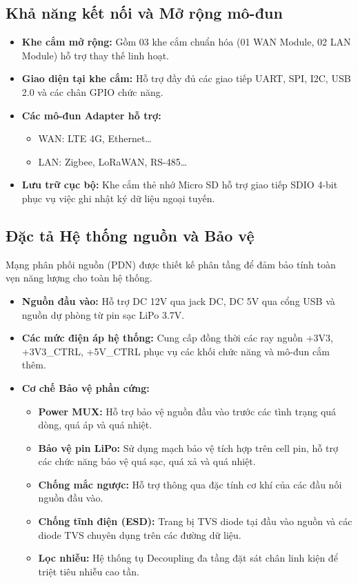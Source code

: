 \subsection{Khả năng kết nối và Mở rộng mô-đun}
\begin{itemize}
    \item \textbf{Khe cắm mở rộng:} Gồm 03 khe cắm chuẩn hóa (01 WAN Module, 02 LAN Module) hỗ trợ thay thế linh hoạt.
    \item \textbf{Giao diện tại khe cắm:} Hỗ trợ đầy đủ các giao tiếp UART, SPI, I2C, USB 2.0 và các chân GPIO chức năng.
    \item \textbf{Các mô-đun Adapter hỗ trợ:}
    \begin{itemize}
        \item WAN: LTE 4G, Ethernet\dots
        \item LAN: Zigbee, LoRaWAN, RS-485\dots
    \end{itemize}
    \item \textbf{Lưu trữ cục bộ:} Khe cắm thẻ nhớ Micro SD hỗ trợ giao tiếp SDIO 4-bit phục vụ việc ghi nhật ký dữ liệu ngoại tuyến.
\end{itemize}

\subsection{Đặc tả Hệ thống nguồn và Bảo vệ}
Mạng phân phối nguồn (PDN) được thiết kế phân tầng để đảm bảo tính toàn vẹn năng lượng cho toàn hệ thống.
\begin{itemize}
    \item \textbf{Nguồn đầu vào:} Hỗ trợ DC 12V qua jack DC, DC 5V qua cổng USB và nguồn dự phòng từ pin sạc LiPo 3.7V.
    \item \textbf{Các mức điện áp hệ thống:} Cung cấp đồng thời các ray nguồn +3V3, +3V3\_CTRL, +5V\_CTRL phục vụ các khối chức năng và mô-đun cắm thêm.
    \item \textbf{Cơ chế Bảo vệ phần cứng:}
    \begin{itemize}
        \item \textbf{Power MUX:} Hỗ trợ bảo vệ nguồn đầu vào trước các tình trạng quá dòng, quá áp và quá nhiệt.
        \item \textbf{Bảo vệ pin LiPo:} Sử dụng mạch bảo vệ tích hợp trên cell pin, hỗ trợ các chức năng bảo vệ quá sạc, quá xả và quá nhiệt.
        \item \textbf{Chống mắc ngược:} Hỗ trợ thông qua đặc tính cơ khí của các đầu nối nguồn đầu vào.
        \item \textbf{Chống tĩnh điện (ESD):} Trang bị TVS diode tại đầu vào nguồn và các diode TVS chuyên dụng trên các đường dữ liệu.
        \item \textbf{Lọc nhiễu:} Hệ thống tụ Decoupling đa tầng đặt sát chân linh kiện để triệt tiêu nhiễu cao tần.
    \end{itemize}
\end{itemize}

